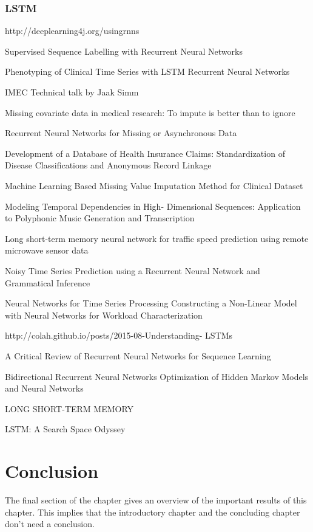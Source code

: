 \subsubsection{LSTM}


http://deeplearning4j.org/usingrnns

Supervised Sequence Labelling with Recurrent Neural
Networks

Phenotyping of Clinical Time Series with LSTM
Recurrent Neural Networks

IMEC Technical talk by Jaak Simm

Missing covariate data in medical research: To impute
is better than to ignore


Recurrent Neural Networks for Missing or
Asynchronous Data

Development of a Database of Health Insurance
Claims: Standardization of Disease Classifications and
Anonymous Record Linkage

Machine Learning Based Missing Value Imputation
Method for Clinical Dataset

Modeling Temporal Dependencies in High-
Dimensional Sequences: Application to Polyphonic
Music Generation and Transcription

Long short-term memory neural network for traffic
speed prediction using remote microwave sensor data


Noisy Time Series Prediction using a Recurrent Neural
Network and Grammatical Inference

Neural Networks for Time Series Processing
Constructing a Non-Linear Model with Neural
Networks for Workload Characterization



http://colah.github.io/posts/2015-08-Understanding-
LSTMs

A Critical Review of Recurrent Neural Networks
for Sequence Learning

Bidirectional Recurrent Neural Networks
Optimization of Hidden Markov Models and Neural
Networks


LONG SHORT-TERM MEMORY

LSTM: A Search Space Odyssey

\section{Conclusion}
The final section of the chapter gives an overview of the important results
of this chapter. This implies that the introductory chapter and the
concluding chapter don't need a conclusion.




